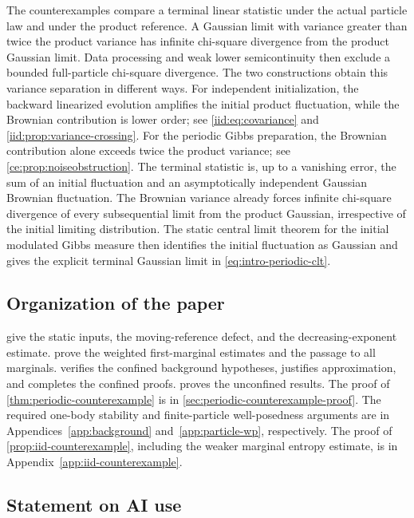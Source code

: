 \documentclass[11pt,reqno]{amsart}
\numberwithin{equation}{section}
\theoremstyle{plain}
\theoremstyle{remark}
\begin{document}
The counterexamples compare a terminal linear statistic under the actual particle law and under the product reference. A Gaussian limit with variance greater than twice the product variance has infinite chi-square divergence from the product Gaussian limit. Data processing and weak lower semicontinuity then exclude a bounded full-particle chi-square divergence. The two constructions obtain this variance separation in different ways. For independent initialization, the backward linearized evolution amplifies the initial product fluctuation, while the Brownian contribution is lower order; see \eqref{iid:eq:covariance} and \cref{iid:prop:variance-crossing}. For the periodic Gibbs preparation, the Brownian contribution alone exceeds twice the product variance; see \cref{ce:prop:noiseobstruction}. The terminal statistic is, up to a vanishing error, the sum of an initial fluctuation and an asymptotically independent Gaussian Brownian fluctuation. The Brownian variance already forces infinite chi-square divergence of every subsequential limit from the product Gaussian, irrespective of the initial limiting distribution. The static central limit theorem for the initial modulated Gibbs measure then identifies the initial fluctuation as Gaussian and gives the explicit terminal Gaussian limit in \eqref{eq:intro-periodic-clt}.


\subsection{Organization of the paper}\label{sec:organization}

 give the static inputs, the moving-reference defect, and the decreasing-exponent estimate.  prove the weighted first-marginal estimates and the passage to all marginals.  verifies the confined background hypotheses, justifies approximation, and completes the confined proofs.  proves the unconfined results. The proof of \cref{thm:periodic-counterexample} is in \cref{sec:periodic-counterexample-proof}. The required one-body stability and finite-particle well-posedness arguments are in Appendices~\ref{app:background} and~\ref{app:particle-wp}, respectively. The proof of \cref{prop:iid-counterexample}, including the weaker marginal entropy estimate, is in Appendix~\ref{app:iid-counterexample}.


\subsection{Statement on AI use}
\end{document}
